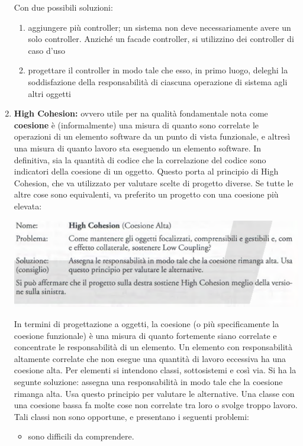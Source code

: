 \documentclass[a4paper,12pt, oneside]{book}
\begin{document}
\begin{enumerate}
Con due possibili soluzioni:
\begin{enumerate}
\item aggiungere più controller; un sistema non deve necessariamente avere un solo
  controller. Anziché un facade controller, si utilizzino dei controller di caso d'uso
\item progettare il controller in modo tale che esso, in primo luogo, deleghi la soddisfazione
della responsabilità di ciascuna operazione di sistema agli altri oggetti
\end{enumerate}
\item \textbf{High Cohesion:} ovvero utile per na qualità fondamentale nota come
\textbf{coesione} è (informalmente) una misura di quanto sono correlate le operazioni di un
elemento software da un punto di vista funzionale, e altresì una misura di quanto lavoro
sta eseguendo un elemento software. In definitiva, sia la quantità di codice
che la correlazione del codice sono indicatori della coesione di un oggetto. Questo porta al principio di High
Cohesion, che va utilizzato per valutare scelte di progetto diverse. Se tutte le altre cose
sono equivalenti, va preferito un progetto con una coesione più elevata:
\begin{center}
\includegraphics[scale = 0.7]{img/grasp12.png}
\end{center}
In termini di progettazione a oggetti, la coesione (o più specificamente la coesione
funzionale) è una misura di quanto fortemente siano correlate e concentrate le responsabilità di un elemento. Un elemento con responsabilità altamente correlate che
non esegue una quantità di lavoro eccessiva ha una coesione alta. Per elementi si intendono classi,
sottosistemi e così via.
Si ha la segunte soluzione: assegna una responsabilità in modo tale che la coesione rimanga alta. Usa questo principio per valutare le alternative.
Una classe con una coesione bassa fa molte cose non correlate tra loro o svolge troppo
lavoro. Tali classi non sono opportune, e presentano i seguenti problemi:
\begin{itemize}
\item sono difficili da comprendere.

\end{itemize}
\end{enumerate}
\end{document}

